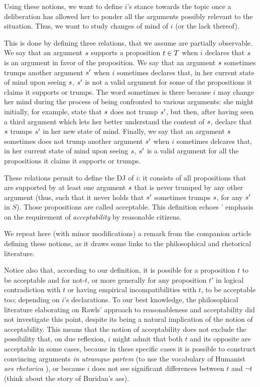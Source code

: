 \documentclass[version=3.21, pagesize, twoside=off, bibliography=totoc, DIV=calc, fontsize=12pt, a4paper, french, english]{scrartcl}
\begin{document}
Using these notions, we want to define $i$’s stance towards the topic once a deliberation has allowed her to ponder all the arguments possibly relevant to the situation. 
Thus, we want to study changes of mind of $i$ (or the lack thereof).

This is done by defining three relations, that we assume are partially observable. We say that an argument $s$ supports a proposition $t \in T$ when $i$ declares that $s$ is an argument in favor of the proposition. We say that an argument $s$ sometimes trumps another argument $s'$ when $i$ sometimes declares that, in her current state of mind upon seeing $s$, $s'$ is not a valid argument for some of the propositions it claims it supports or trumps. The word sometimes is there because $i$ may change her mind during the process of being confronted to various arguments: she might initially, for example, state that $s$ does not trump $s'$, but then, after having seen a third argument which lets her better understand the content of $s$, declare that $s$ trumps $s'$ in her new state of mind. Finally, we say that an argument $s$ sometimes does not trump another argument $s'$ when $i$ sometimes delcares that, in her current state of mind upon seeing $s$, $s'$ is a valid argument for all the propositions it claims it supports or trumps.

These relations permit to define the \ac{DJ} of $i$: it consists of all propositions that are supported by at least one argument $s$ that is never trumped by any other argument (thus, such that it never holds that $s'$ sometimes trumps $s$, for any $s'$ in $S$). Those propositions are called acceptable. This definition echoes \citeauthor{rawls_political_2005}’ \citeyearpar{rawls_political_2005} emphasis on the requirement of \emph{acceptability} by reasonable citizens. 

We repeat here (with minor modifications) a remark from the companion article defining these notions, as it draws some links to the philosophical and rhetorical literature.
\begin{remark}
Notice also that, according to our definition, it is possible for a proposition $t$ to be acceptable and for not-$t$, or more generally for any proposition $t'$ in logical contradiction with $t$ or having empirical incompatibilities with $t$, to be acceptable too; depending on $i$’s declarations.
To our best knowledge, the philosophical literature elaborating on Rawls' approach to reasonableness and acceptability did not investigate this point, despite its being a natural implication of the notion of acceptability. 
This means that the notion of acceptability does not exclude the possibility that, on due reflexion, $i$ might admit that both $t$ and its opposite are acceptable in some cases, because in these specific cases it is possible to construct convincing arguments \emph{in utramque partem} (to use the vocabulary of Humanist \emph{ars rhetorica} \citep{skinner_reason_1996}), or because $i$ does not see significant differences between $t$ and $¬t$ (think about the story of Buridan’s ass).
\end{remark}
\end{document}
